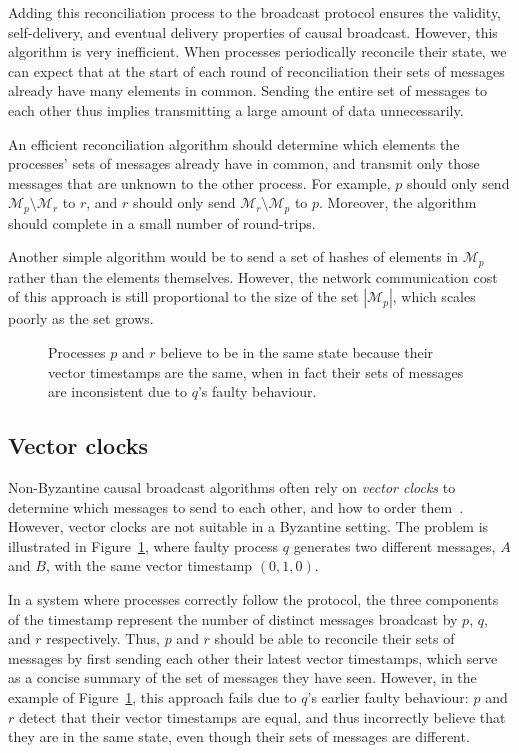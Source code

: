 \documentclass[a4paper,anonymous,USenglish]{lipics-v2019}
\begin{document}
Adding this reconciliation process to the broadcast protocol ensures the validity, self-delivery, and eventual delivery properties of causal broadcast.
However, this algorithm is very inefficient.
When processes periodically reconcile their state, we can expect that at the start of each round of reconciliation their sets of messages already have many elements in common.
Sending the entire set of messages to each other thus implies transmitting a large amount of data unnecessarily.

An efficient reconciliation algorithm should determine which elements the processes' sets of messages already have in common, and transmit only those messages that are unknown to the other process.
For example, $p$ should only send $\mathcal{M}_p \setminus \mathcal{M}_r$ to $r$, and $r$ should only send $\mathcal{M}_r \setminus \mathcal{M}_p$ to $p$.
Moreover, the algorithm should complete in a small number of round-trips.

Another simple algorithm would be to send a set of hashes of elements in $\mathcal{M}_p$ rather than the elements themselves.
However, the network communication cost of this approach is still proportional to the size of the set $|\mathcal{M}_p|$, which scales poorly as the set grows.

\begin{figure}
    \centering
    
    \caption{Processes $p$ and $r$ believe to be in the same state because their vector timestamps are the same, when in fact their sets of messages are inconsistent due to $q$'s faulty behaviour.}
    \label{fig:vectorclocks}
\end{figure}

\subsection{Vector clocks}

Non-Byzantine causal broadcast algorithms often rely on \emph{vector clocks} to determine which messages to send to each other, and how to order them~\cite{Birman:1991el,Schwarz:1994}.
However, vector clocks are not suitable in a Byzantine setting.
The problem is illustrated in Figure~\ref{fig:vectorclocks}, where faulty process $q$ generates two different messages, $A$ and $B$, with the same vector timestamp $(0, 1, 0)$.

In a system where processes correctly follow the protocol, the three components of the timestamp represent the number of distinct messages broadcast by $p$, $q$, and $r$ respectively.
Thus, $p$ and $r$ should be able to reconcile their sets of messages by first sending each other their latest vector timestamps, which serve as a concise summary of the set of messages they have seen.
However, in the example of Figure~\ref{fig:vectorclocks}, this approach fails due to $q$'s earlier faulty behaviour: $p$ and $r$ detect that their vector timestamps are equal, and thus incorrectly believe that they are in the same state, even though their sets of messages are different.
\end{document}
